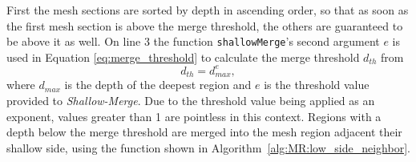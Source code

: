 First the mesh sections are sorted by depth in ascending order, so that as soon as the first mesh section is above the merge threshold, the others are guaranteed to be above it as well.
On line 3 the function \verb|shallowMerge|'s second argument $e$ is used in Equation \ref{eq:merge_threshold} to calculate the merge threshold $d_{th}$ from
\begin{equation}\label{eq:merge_threshold}
	d_{th} = d_{max}^{e},
\end{equation}
where $d_{max}$ is the depth of the deepest region and $e$ is the threshold value provided to \textit{Shallow-Merge}.
Due to the threshold value being applied as an exponent, values greater than 1 are pointless in this context.
Regions with a depth below the merge threshold are merged into the mesh region adjacent their shallow side, using the function shown in Algorithm~\ref{alg:MR:low_side_neighbor}.


